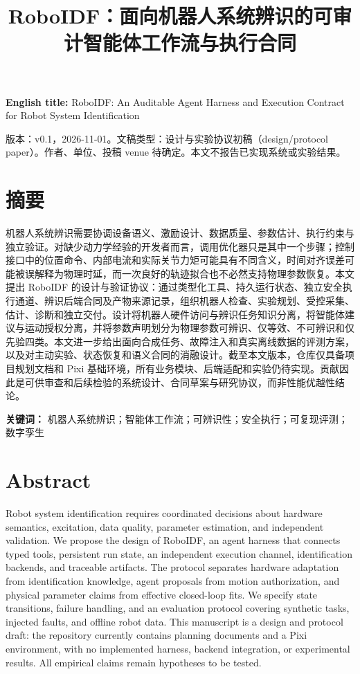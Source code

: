 \documentclass[
  chinese,
  11pt,
  a4paper,
  fontset=fandol]{ctexart}
\title{RoboIDF：面向机器人系统辨识的可审计智能体工作流与执行合同}
\author{}
\date{}
\begin{document}
\maketitle

\textbf{English title:} RoboIDF: An Auditable Agent Harness and
Execution Contract for Robot System Identification

版本：v0.1，2026-11-01。文稿类型：设计与实验协议初稿（design/protocol
paper）。作者、单位、投稿 venue 待确定。本文不报告已实现系统或实验结果。

\section{摘要}\label{ux6458ux8981}

机器人系统辨识需要协调设备语义、激励设计、数据质量、参数估计、执行约束与独立验证。对缺少动力学经验的开发者而言，调用优化器只是其中一个步骤；控制接口中的位置命令、内部电流和实际关节力矩可能具有不同含义，时间对齐误差可能被误解释为物理时延，而一次良好的轨迹拟合也不必然支持物理参数恢复。本文提出
RoboIDF
的设计与验证协议：通过类型化工具、持久运行状态、独立安全执行通道、辨识后端合同及产物来源记录，组织机器人检查、实验规划、受控采集、估计、诊断和独立交付。设计将机器人硬件访问与辨识任务知识分离，将智能体建议与运动授权分离，并将参数声明划分为物理参数可辨识、仅等效、不可辨识和仅先验四类。本文进一步给出面向合成任务、故障注入和真实离线数据的评测方案，以及对主动实验、状态恢复和语义合同的消融设计。截至本文版本，仓库仅具备项目规划文档和
Pixi
基础环境，所有业务模块、后端适配和实验仍待实现。贡献因此是可供审查和后续检验的系统设计、合同草案与研究协议，而非性能优越性结论。

\textbf{关键词：}
机器人系统辨识；智能体工作流；可辨识性；安全执行；可复现评测；数字孪生

\section{Abstract}\label{abstract}

Robot system identification requires coordinated decisions about
hardware semantics, excitation, data quality, parameter estimation, and
independent validation. We propose the design of RoboIDF, an agent
harness that connects typed tools, persistent run state, an independent
execution channel, identification backends, and traceable artifacts. The
protocol separates hardware adaptation from identification knowledge,
agent proposals from motion authorization, and physical parameter claims
from effective closed-loop fits. We specify state transitions, failure
handling, and an evaluation protocol covering synthetic tasks, injected
faults, and offline robot data. This manuscript is a design and protocol
draft: the repository currently contains planning documents and a Pixi
environment, with no implemented harness, backend integration, or
experimental results. All empirical claims remain hypotheses to be
tested.
\end{document}
